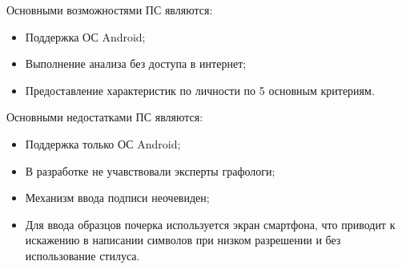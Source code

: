 Основными возможностями ПС являются:
\begin{itemize}
  \item Поддержка ОС Android;
  \item Выполнение анализа без доступа в интернет;
  \item Предоставление характеристик по личности по 5 основным критериям.
\end{itemize}

Основными недостатками ПС являются:
\begin{itemize}
  \item Поддержка только ОС Android;
  \item В разработке не учавствовали эксперты графологи;
  \item Механизм ввода подписи неочевиден;
  \item Для ввода образцов почерка используется экран смартфона, что приводит к искажению в написании символов при низком разрешении и без использование стилуса.
\end{itemize}

